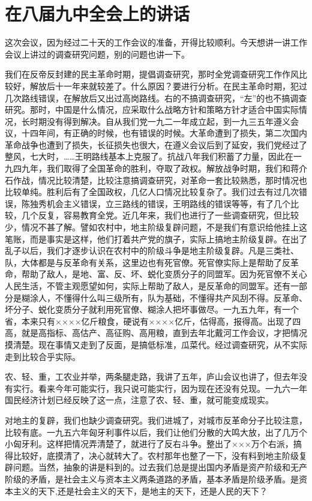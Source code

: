 \section[在八届九中全会上的讲话（一九六一年一月十八日）]{在八届九中全会上的讲话}

这次会议，因为经过二十天的工作会议的准备，开得比较顺利。今天想讲一讲工作会议上讲过的调查研究问题，别的问题也讲一下。

我们在反帝反封建的民主革命时期，提倡调查研究，那时全党调查研究工作作风比较好，解放后十一年来就较差了。什么原因？要进行分析。在民主革命时期，犯过几次路线错误，在解放后又出过高岗路线。右的不搞调查研究，“左”的也不搞调查研究。那时，中国是什么情况，应采取什么战略方针和策略方针才适合中国实际情况，长时期没有得到解决。自从我们党一九二一年成立起，到一九三五年遵义会议，十四年间，有正确的时候，也有错误的时候。大革命遭到了损失，第二次国内革命战争也遭到了损失，长征损失也很大，在遵义会议后到了延安，我们党经过了整风，七大时，……王明路线基本上克服了。抗战八年我们积蓄了力量，因此在一九四九年，我们取得了全国革命的胜利，夺取了政权。解放战争时期，我们和蒋介石作战，情况比较清楚，比较注意搞调查研究，对革命一套比较熟悉，那时情况也比较单纯。胜利后有了全国政权，几亿人口情况比较复杂了。我们过去有过几次错误，陈独秀机会主义错误，立三路线的错误，王明路线的错误等等，有了几个比较，几个反复，容易教育全党。近几年来，我们也进行了一些调查研究，但比较少，情况不甚了解。譬如农村中，地主阶级复辟问题，不是我们有意识给他挂上这笔账，而是事实是这样，他们打着共产党的旗子，实际上搞地主阶级复辟。在出了乱子以后，我们才逐步认识在农村中的阶级斗争是地主阶级复辟。凡是三类社、队，大体都是与反革命有关系，这里边也有死官僚。死官僚实际上是帮助了反革命，帮助了敌人，是地、富、反、坏、蜕化变质分子的同盟军。因为死官僚不关心人民生活，不管主观愿望如何，实际上帮助了敌人，是反革命的同盟军。还有一部分是糊涂人，不懂得什么叫三级所有，队为基础，不懂得共产风刮不得。反革命、坏分子、蜕化变质分子就利用死官僚、糊涂人把坏事做尽。一九五九年，有一个省，本来只有××××亿斤粮食，硬说有××××亿斤，估得高，报得高。出现了四高，就是高指标、高估产、高征购、高用粮，直到去年北戴河工作会议，才把情况摸清楚。现在事情又走到了反面，是搞低标准，瓜菜代。经过调查研究，从不实际走到比较合乎实际。

农、轻、重，工农业并举，两条腿走路，我讲了五年，庐山会议也讲了，但去年没有实行。看来今年可能实行，我只说可能实行，因为现在还没有兑现。一九六一年国民经济计划已经反映了这一点，注意了农、轻、重，就可能变成现实。

对地主的复辟，我们也缺少调查研究。我们进城了，对城市反革命分子比较注意，比较有底。一九五六年匈牙利事件以后，我们让他们分散的大鸣大放，出了几万个小匈牙利。这样把情况弄清楚了，就进行了反右斗争。整出了×××万个右派，搞得比较好，底摸清了，决心就转大了。农村那年也整了一下，没有料到地主阶级复辟问题。当然，抽象的讲是料到的。过去我们总是提出国内矛盾是资产阶级和无产阶级的矛盾，是社会主义与资本主义两条道路的矛盾，基本矛盾是阶级矛盾。是资本主义的天下,还是社会主义的天下，是地主的天下，还是人民的天下？

